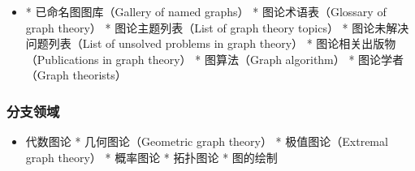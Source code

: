 \begin{itemize}
\item * 已命名图图库（Gallery of named graphs）
* 图论术语表（Glossary of graph theory）
* 图论主题列表（List of graph theory topics）
* 图论未解决问题列表（List of unsolved problems in graph theory）
* 图论相关出版物（Publications in graph theory）
* 图算法（Graph algorithm）
* 图论学者（Graph theorists）
\end{itemize}
\subsubsection{分支领域}
\begin{itemize}
\item 代数图论
* 几何图论（Geometric graph theory）
* 极值图论（Extremal graph theory）
* 概率图论
* 拓扑图论
* 图的绘制
\end{itemize}